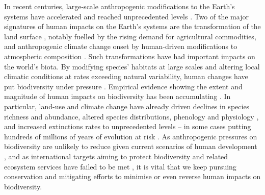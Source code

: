 

In recent centuries, large-scale anthropogenic modifications to the Earth's systems have accelerated and reached unprecedented levels \citep{Steffen2015}. Two of the major signatures of human impacts on the Earth's systems are the transformation of the land surface \citep{Ellis2010}, notably fuelled by the rising demand for agricultural commodities, and anthropogenic climate change onset by human-driven modifications to atmospheric composition \citep{Lewis2015}. Such transformations have had important impacts on the world's biota. By modifying species' habitats at large scales and altering local climatic conditions at rates exceeding natural variability, human changes have put biodiversity under pressure \citep{Maxwell2016}. Empirical evidence showing the extent and magnitude of human impacts on biodiversity has been accumulating \citep{Newbold2015, Young2016, Daru2021}. In particular, land-use and climate change have already driven declines in species richness and abundance, altered species distributions, phenology and physiology \citep{Portner2008, Chown2010, Chen2011, Dirzo2014, Lenoir2015, Newbold2015, Soroye2020, Inouye2022, Butchart2010}, and increased extinctions rates to unprecedented levels \citep{Barnosky2011, Ceballos2015, DeVos2015} -- in some cases putting hundreds of millions of years of evolution at risk \citep{Nowakowski2018a, IUCN2020}. As anthropogenic pressures on biodiversity are unlikely to reduce given current scenarios of human development \citep{Stehfest2019}, and as international targets aiming to protect biodiversity and related ecosystem services have failed to be met \citep{Buchanan2020}, it is vital that we keep pursuing conservation and mitigating efforts to minimise or even reverse human impacts on biodiversity.

